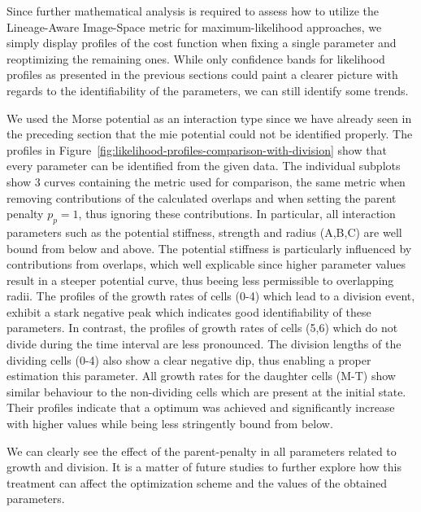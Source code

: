 \documentclass[10pt,letterpaper]{article}
\begin{document}
Since further mathematical analysis is required to assess how to utilize the Lineage-Aware
Image-Space metric for maximum-likelihood approaches, we simply display profiles of the cost
function when fixing a single parameter and reoptimizing the remaining ones.
While only confidence bands for likelihood profiles as presented in the previous sections could
paint a clearer picture with regards to the identifiability of the parameters, we can still
identify some trends.

We used the Morse potential as an interaction type since we have already seen in the preceding
section that the mie potential could not be identified properly.
The profiles in Figure~\ref{fig:likelihood-profiles-comparison-with-division} show that every
parameter can be identified from the given data.
The individual subplots show 3 curves containing the metric used for comparison, the same metric
when removing contributions of the calculated overlaps and when setting the parent penalty $p_p=1$,
thus ignoring these contributions.
In particular, all interaction parameters such as the potential stiffness, strength and radius
(A,B,C) are well bound from below and above.
The potential stiffness is particularly influenced by contributions from overlaps, which well
explicable since higher parameter values result in a steeper potential curve, thus beeing less
permissible to overlapping radii.
The profiles of the growth rates of cells (0-4) which lead to a division event, exhibit a stark
negative peak which indicates good identifiability of these parameters.
In contrast, the profiles of growth rates of cells (5,6) which do not divide during the time
interval are less pronounced.
The division lengths of the dividing cells (0-4) also show a clear negative dip, thus enabling a
proper estimation this parameter.
All growth rates for the daughter cells (M-T) show similar behaviour to the
non-dividing cells which are present at the initial state.
Their profiles indicate that a optimum was achieved and significantly increase with higher values
while being less stringently bound from below.

We can clearly see the effect of the parent-penalty in all parameters related to growth and
division.
It is a matter of future studies to further explore how this treatment can affect the optimization
scheme and the values of the obtained parameters.
\end{document}

